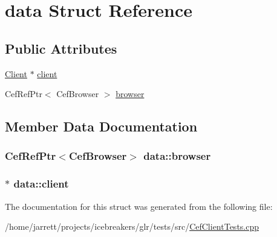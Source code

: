 \hypertarget{structdata}{\section{data Struct Reference}
\label{structdata}
}
\subsection*{Public Attributes}
\begin{DoxyCompactItemize}
\item 
\hyperlink{classClient}{Client} $\ast$ \hyperlink{structdata_a8075a7b34727b2a31c9618c06a341793}{client}
\item 
Cef\-Ref\-Ptr$<$ Cef\-Browser $>$ \hyperlink{structdata_ad0c9b688b94e0f43ab43ea791e547198}{browser}
\end{DoxyCompactItemize}


\subsection{Member Data Documentation}
\hypertarget{structdata_ad0c9b688b94e0f43ab43ea791e547198}{
\subsubsection[{browser}]{\setlength{\rightskip}{0pt plus 5cm}Cef\-Ref\-Ptr$<$Cef\-Browser$>$ data\-::browser}}\label{structdata_ad0c9b688b94e0f43ab43ea791e547198}
\hypertarget{structdata_a8075a7b34727b2a31c9618c06a341793}{
\subsubsection[{client}]{$\ast$ data\-::client}}\label{structdata_a8075a7b34727b2a31c9618c06a341793}


The documentation for this struct was generated from the following file\-:\begin{DoxyCompactItemize}
\item 
/home/jarrett/projects/icebreakers/glr/tests/src/\hyperlink{CefClientTests_8cpp}{Cef\-Client\-Tests.\-cpp}\end{DoxyCompactItemize}
